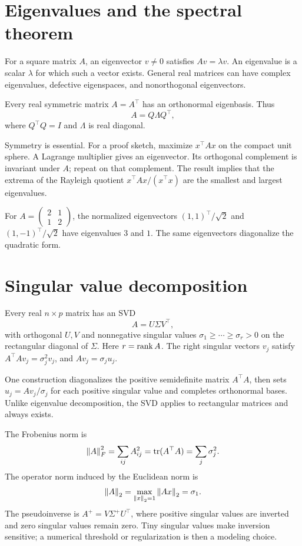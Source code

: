 \section{Eigenvalues and the spectral theorem}
For a square matrix \(A\), an eigenvector \(v\ne0\) satisfies \(Av=\lambda v\). An eigenvalue is a scalar \(\lambda\) for which such a vector exists. General real matrices can have complex eigenvalues, defective eigenspaces, and nonorthogonal eigenvectors.

\begin{theorem}
Every real symmetric matrix \(A=A^\top\) has an orthonormal eigenbasis. Thus
\[
A=Q\Lambda Q^\top,
\]
where \(Q^\top Q=I\) and \(\Lambda\) is real diagonal.
\end{theorem}
Symmetry is essential. For a proof sketch, maximize \(x^\top Ax\) on the compact unit sphere. A Lagrange multiplier gives an eigenvector. Its orthogonal complement is invariant under \(A\); repeat on that complement. The result implies that the extrema of the Rayleigh quotient \(x^\top Ax/(x^\top x)\) are the smallest and largest eigenvalues.

For \(A=\begin{pmatrix}2&1\\1&2\end{pmatrix}\), the normalized eigenvectors \((1,1)^\top/\sqrt2\) and \((1,-1)^\top/\sqrt2\) have eigenvalues \(3\) and \(1\). The same eigenvectors diagonalize the quadratic form.

\section{Singular value decomposition}
Every real \(n\times p\) matrix has an SVD
\[
A=U\Sigma V^\top,
\]
with orthogonal \(U,V\) and nonnegative singular values \(\sigma_1\geq\cdots\geq\sigma_r>0\) on the rectangular diagonal of \(\Sigma\). Here \(r=\operatorname{rank} A\). The right singular vectors \(v_j\) satisfy \(A^\top A v_j=\sigma_j^2v_j\), and \(Av_j=\sigma_ju_j\).

One construction diagonalizes the positive semidefinite matrix \(A^\top A\), then sets \(u_j=Av_j/\sigma_j\) for each positive singular value and completes orthonormal bases. Unlike eigenvalue decomposition, the SVD applies to rectangular matrices and always exists.

The Frobenius norm is
\[
\left\lVert A\right\rVert_F^2=\sum_{ij}A_{ij}^2=\operatorname{tr}(A^\top A)=\sum_j\sigma_j^2.
\]
The operator norm induced by the Euclidean norm is
\[
\left\lVert A\right\rVert_2=\max_{\left\lVert x\right\rVert_2=1}\left\lVert Ax\right\rVert_2=\sigma_1.
\]
The pseudoinverse is \(A^+=V\Sigma^+U^\top\), where positive singular values are inverted and zero singular values remain zero. Tiny singular values make inversion sensitive; a numerical threshold or regularization is then a modeling choice.

